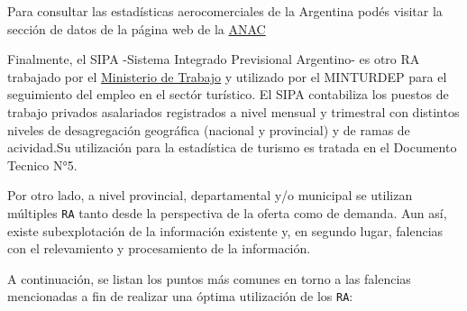 \documentclass[
]{book}
\begin{document}
Para consultar las estadísticas aerocomerciales de la Argentina podés visitar la sección de datos de la página web de la \href{https://datos.anac.gob.ar/estadisticas/}{ANAC}

Finalmente, el SIPA -Sistema Integrado Previsional Argentino- es otro RA trabajado por el \href{http://www.trabajo.gob.ar/estadisticas/}{Ministerio de Trabajo} y utilizado por el MINTURDEP para el seguimiento del empleo en el sectór turístico. El SIPA contabiliza los puestos de trabajo privados asalariados registrados a nivel mensual y trimestral con distintos niveles de desagregación geográfica (nacional y provincial) y de ramas de acividad.Su utilización para la estadística de turismo es tratada en el Documento Tecnico N°5.

Por otro lado, a nivel provincial, departamental y/o municipal se utilizan múltiples \texttt{RA} tanto desde la perspectiva de la oferta como de demanda. Aun así, existe subexplotación de la información existente y, en segundo lugar, falencias con el relevamiento y procesamiento de la información.

A continuación, se listan los puntos más comunes en torno a las falencias mencionadas a fin de realizar una óptima utilización de los \texttt{RA}:
\end{document}
